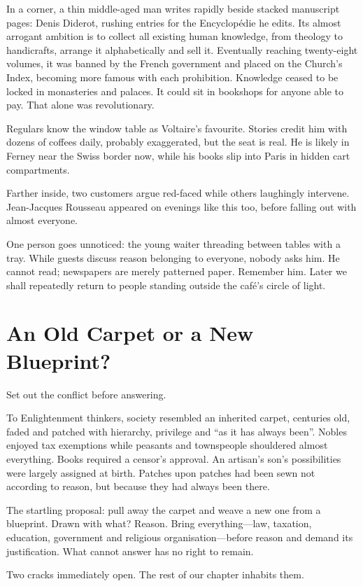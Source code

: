 In a corner, a thin middle-aged man writes rapidly beside stacked manuscript pages: Denis Diderot, rushing entries for the Encyclopédie he edits. Its almost arrogant ambition is to collect all existing human knowledge, from theology to handicrafts, arrange it alphabetically and sell it. Eventually reaching twenty-eight volumes, it was banned by the French government and placed on the Church's Index, becoming more famous with each prohibition. Knowledge ceased to be locked in monasteries and palaces. It could sit in bookshops for anyone able to pay. That alone was revolutionary.

Regulars know the window table as Voltaire's favourite. Stories credit him with dozens of coffees daily, probably exaggerated, but the seat is real. He is likely in Ferney near the Swiss border now, while his books slip into Paris in hidden cart compartments.

Farther inside, two customers argue red-faced while others laughingly intervene. Jean-Jacques Rousseau appeared on evenings like this too, before falling out with almost everyone.

One person goes unnoticed: the young waiter threading between tables with a tray. While guests discuss reason belonging to everyone, nobody asks him. He cannot read; newspapers are merely patterned paper. Remember him. Later we shall repeatedly return to people standing outside the café's circle of light.

\section{An Old Carpet or a New Blueprint?}
Set out the conflict before answering.

To Enlightenment thinkers, society resembled an inherited carpet, centuries old, faded and patched with hierarchy, privilege and ``as it has always been''. Nobles enjoyed tax exemptions while peasants and townspeople shouldered almost everything. Books required a censor's approval. An artisan's son's possibilities were largely assigned at birth. Patches upon patches had been sewn not according to reason, but because they had always been there.

The startling proposal: pull away the carpet and weave a new one from a blueprint. Drawn with what? Reason. Bring everything---law, taxation, education, government and religious organisation---before reason and demand its justification. What cannot answer has no right to remain.

Two cracks immediately open. The rest of our chapter inhabits them.

